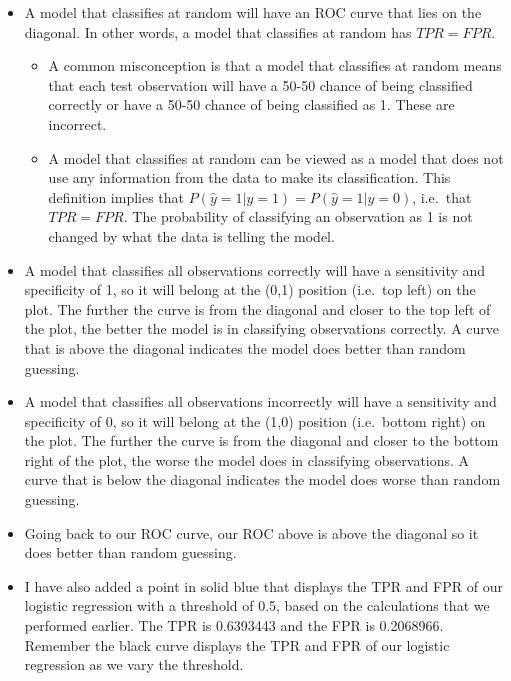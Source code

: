 \documentclass[
]{book}
\providecommand{\tightlist}{%
  \setlength{\itemsep}{0pt}\setlength{\parskip}{0pt}}
\begin{document}
\begin{itemize}
\item
  A model that classifies at random will have an ROC curve that lies on the diagonal. In other words, a model that classifies at random has \(TPR = FPR\).

  \begin{itemize}
  \tightlist
  \item
    A common misconception is that a model that classifies at random means that each test observation will have a 50-50 chance of being classified correctly or have a 50-50 chance of being classified as 1. These are incorrect.
  \item
    A model that classifies at random can be viewed as a model that does not use any information from the data to make its classification. This definition implies that \(P(\hat{y} = 1 | y = 1) = P(\hat{y} = 1 | y = 0)\), i.e.~that \(TPR = FPR\). The probability of classifying an observation as 1 is not changed by what the data is telling the model.
  \end{itemize}
\item
  A model that classifies all observations correctly will have a sensitivity and specificity of 1, so it will belong at the (0,1) position (i.e.~top left) on the plot. The further the curve is from the diagonal and closer to the top left of the plot, the better the model is in classifying observations correctly. A curve that is above the diagonal indicates the model does better than random guessing.
\item
  A model that classifies all observations incorrectly will have a sensitivity and specificity of 0, so it will belong at the (1,0) position (i.e.~bottom right) on the plot. The further the curve is from the diagonal and closer to the bottom right of the plot, the worse the model does in classifying observations. A curve that is below the diagonal indicates the model does worse than random guessing.
\item
  Going back to our ROC curve, our ROC above is above the diagonal so it does better than random guessing.
\item
  I have also added a point in solid blue that displays the TPR and FPR of our logistic regression with a threshold of 0.5, based on the calculations that we performed earlier. The TPR is 0.6393443 and the FPR is 0.2068966. Remember the black curve displays the TPR and FPR of our logistic regression as we vary the threshold.
\end{itemize}
\end{document}

